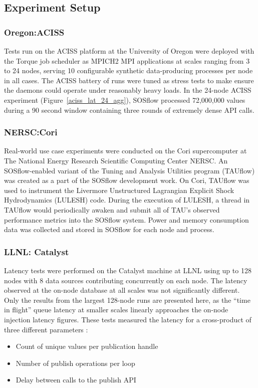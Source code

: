 \subsection{Experiment Setup} %
%
\subsubsection{Oregon:ACISS} %
Tests run on the ACISS platform at the University of Oregon were
deployed with the Torque job scheduler as MPICH2 MPI applications at
scales ranging from 3 to 24 nodes, serving 10 configurable synthetic
data-producing processes per node in all cases.
%
The ACISS battery of runs were tuned as stress tests to make ensure
the daemons could operate under reasonably heavy loads.
%
In the 24-node ACISS experiment (Figure~\ref{aciss_lat_24_agg}),
SOSflow processed 72,000,000 values during a 90 second window
containing three rounds of extremely dense API calls.
%


\subsubsection{NERSC:Cori} %
Real-world use case experiments were conducted on the Cori
supercomputer at The National Energy Research Scientific Computing
Center NERSC.
%
An SOSflow-enabled variant of the Tuning and Analysis
Utilities program (TAUflow) was created as a part of the SOSflow
development work.
%
On Cori, TAUflow was used to instrument the Livermore Unstructured
Lagrangian Explicit Shock Hydrodynamics (LULESH) code.
%
During the execution of LULESH, a thread in TAUflow would periodically
awaken and submit all of TAU's observed performance metrics into the
SOSflow system.
%
Power and memory consumption data was collected and stored in SOSflow
for each node and process.


\subsubsection{LLNL: Catalyst} %
Latency tests were performed on the Catalyst machine at LLNL using up
to 128 nodes with 8 data sources contributing concurrently on each
node.
%
The latency observed at the on-node database at all
scales was not significantly different.
%
Only the results from the largest 128-node runs are presented here, as
the ``time in flight'' queue latency at smaller scales linearly
approaches the on-node injection latency figures.
%
These tests measured the latency for a cross-product of three
different parameters :
\begin{itemize}
\item Count of unique values per publication handle
\item Number of publish operations per loop
\item Delay between calls to the publish API
\end{itemize}

